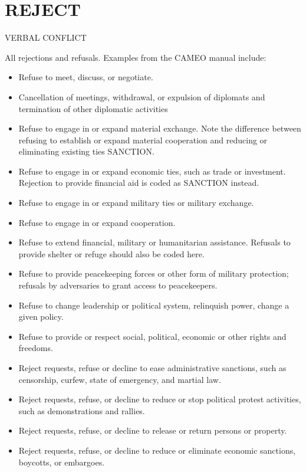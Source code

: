 \documentclass[11pt]{report}
\newcommand{\plcat}[1]{\textsf{#1}}
\begin{document}
\section{REJECT}

\textsf{VERBAL CONFLICT} \vspace{8pt}

All rejections and refusals. Examples from the CAMEO manual include:

\begin{itemize}

\item Refuse to meet, discuss, or negotiate.
\item Cancellation of meetings, withdrawal, or expulsion of diplomats and termination of other diplomatic activities 
\item Refuse to engage in or expand material exchange. Note the difference between refusing to establish or expand material cooperation and reducing or eliminating existing ties \plcat{SANCTION}.
\item Refuse to engage in or expand economic ties, such as trade or investment. Rejection to provide financial aid is coded as \plcat{SANCTION} instead.
\item Refuse to engage in or expand military ties or military exchange.
\item Refuse to engage in or expand cooperation.
\item Refuse to extend financial, military or humanitarian assistance. Refusals to provide shelter or refuge should also be coded here. 
\item Refuse to provide peacekeeping forces or other form of military protection; refusals by adversaries to grant access to peacekeepers.
\item Refuse to change leadership or political system, relinquish power, change a given policy.
\item Refuse to provide or respect social, political, economic or other rights and freedoms.
\item Reject requests, refuse or decline to ease administrative sanctions, such as censorship, curfew, state of emergency, and martial law.
\item Reject requests, refuse, or decline to reduce or stop political protest activities, such as demonstrations and rallies.
\item Reject requests, refuse, or decline to release or return persons or property.
\item Reject requests, refuse, or decline to reduce or eliminate economic sanctions, boycotts, or embargoes.

\end{itemize}
\end{document}
